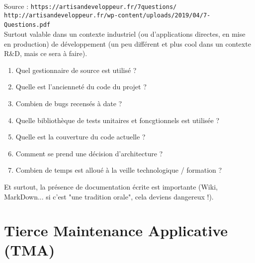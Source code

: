 \documentclass[11pt,twoside,a4paper]{article}
\begin{document}
\begin{landscape}
\begin{multicols}{2}
	Source : \texttt{https://artisandeveloppeur.fr/7questions/}~\\
	\texttt{http://artisandeveloppeur.fr/wp-content/uploads/2019/04/7-Questions.pdf}~\\
	
	
	Surtout valable dans un contexte industriel (ou d'applications directes, en mise en production) de d{\'e}veloppement (un peu diff{\'e}rent et plus cool dans un contexte R\&D, mais ce sera {\`a} faire).  
	\begin{enumerate}
		\item Quel gestionnaire de source est utilis{\'e} ?
		\item Quelle est l'anciennet{\'e} du code du projet ?
		\item Combien de bugs recens{\'e}s {\`a} date ?
		\item Quelle biblioth{\`e}que de tests unitaires et foncgtionnels est utilis{\'e}e ?
		\item Quelle est la couverture du code actuelle ?
		\item Comment se prend une d{\'e}cision d'architecture ?
		\item Combien de temps est allou{\'e} {\`a} la veille technologique / formation ? 
	\end{enumerate}
	
	Et surtout, la pr{\'e}sence de documentation {\'e}crite est importante (Wiki, MarkDown... si c'est "une tradition orale", cela deviens dangereux !). 
	
	\vfill
	\columnbreak
	
	\section*{Tierce Maintenance Applicative (TMA)}
	

\end{multicols}
\end{landscape}
\end{document}
